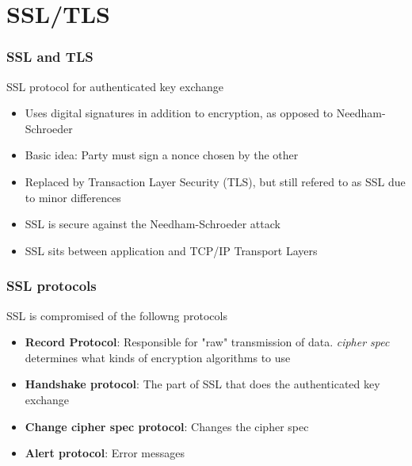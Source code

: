 
    \section{SSL/TLS}
                \begin{frame}
                    \frametitle{SSL and TLS}
                    SSL protocol for authenticated key exchange
                    \begin{itemize}
                        \item Uses digital signatures in addition to encryption, as opposed to Needham-Schroeder
                        \item Basic idea: Party must sign a nonce chosen by the other
                        \item Replaced by Transaction Layer Security (TLS), but still refered to as SSL 
                        due to minor differences
                        \item SSL is secure against the Needham-Schroeder attack
                        \item SSL sits between application and TCP/IP Transport Layers
                    \end{itemize}
                \end{frame}

                \begin{frame}
                    \frametitle{SSL protocols}
                    SSL is compromised of the followng protocols
                    \begin{itemize}
                        \item \textbf{Record Protocol}: Responsible for "raw" transmission of data. \textit{cipher spec} determines what kinds of encryption algorithms to use
                        \item \textbf{Handshake protocol}: The part of SSL that does the authenticated key exchange
                        \item \textbf{Change cipher spec protocol}: Changes the cipher spec
                        \item \textbf{Alert protocol}: Error messages
                    \end{itemize}
                \end{frame}

